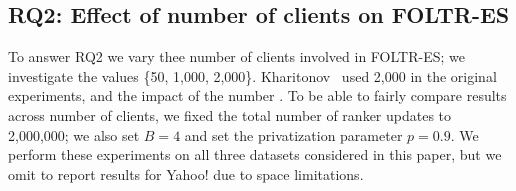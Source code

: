 %

\subsection{RQ2: Effect of number of clients on FOLTR-ES}

To answer RQ2 we vary thee number of clients involved in FOLTR-ES; we investigate the values \{50, 1,000, 2,000\}. Kharitonov~\cite{kharitonov2019federated} used 2,000 in the original experiments, and the impact of the number . To be able to fairly compare results across number of clients, we fixed the total number of ranker updates to 2,000,000; we also set $B = 4$ and set the privatization parameter $p=0.9$. We perform these experiments on all three datasets considered in this paper, but we omit to report results for Yahoo! due to space limitations. 


